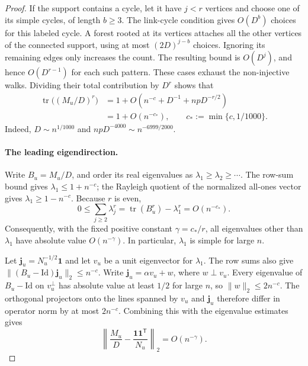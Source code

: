 \begin{proof}
If the support contains a cycle, let it have $j<r$ vertices and choose
one of its simple cycles, of length $b\ge3$.  The link-cycle condition
gives $O(D^b)$ choices for this labeled cycle.  A forest rooted at its
vertices attaches all the other vertices of the connected support,
using at most $(2D)^{j-b}$ choices.  Ignoring its remaining edges only
increases the count.  The resulting bound is $O(D^j)$, and hence
$O(D^{r-1})$ for each such pattern.  These cases exhaust the
non-injective walks.  Dividing their total contribution by $D^r$
shows that
\begin{equation}\label{eq:link-trace}
 \begin{aligned}
 \operatorname{tr}\bigl((M_u/D)^r\bigr)
 &=1+O\!\left(n^{-c}+D^{-1}+npD^{-r/2}\right)\\
 &=1+O(n^{-c_*}),\qquad c_*:=\min\{c,1/1000\}.
 \end{aligned}
\end{equation}
Indeed, $D\sim n^{1/1000}$ and
$npD^{-4000}\sim n^{-6999/2000}$.

\paragraph{The leading eigendirection.}
Write $B_u=M_u/D$, and order its real eigenvalues as
$\lambda_1\ge\lambda_2\ge\cdots$.  The row-sum bound gives
$\lambda_1\le1+n^{-c}$; the Rayleigh quotient of the normalized
all-ones vector gives $\lambda_1\ge1-n^{-c}$.  Because $r$ is even,
\[
 0\le\sum_{j\ge2}\lambda_j^r
 =\operatorname{tr}(B_u^r)-\lambda_1^r
 =O(n^{-c_*}).
\]
Consequently, with the fixed positive constant
$\gamma=c_*/r$, all eigenvalues other than $\lambda_1$ have absolute
value $O(n^{-\gamma})$.  In particular, $\lambda_1$ is simple for
large $n$.

Let $\mathbf j_u=N_u^{-1/2}\mathbf1$ and let $v_u$ be a unit
eigenvector for $\lambda_1$.  The row sums also give
$\lVert(B_u-\mathrm{Id})\mathbf j_u\rVert_2\le n^{-c}$.
Write $\mathbf j_u=\alpha v_u+w$, where $w\perp v_u$.  Every
eigenvalue of $B_u-\mathrm{Id}$ on $v_u^\perp$ has absolute value at
least $1/2$ for large $n$, so $\lVert w\rVert_2\le2n^{-c}$.
The orthogonal projectors onto the lines spanned by $v_u$ and
$\mathbf j_u$ therefore differ in operator norm by at most
$2n^{-c}$.  Combining this with the eigenvalue estimates gives
\begin{equation}\label{eq:star-approximation}
 \left\lVert \frac{M_u}{D}-\frac{\mathbf1\mathbf1^{\mathsf T}}{N_u}
 \right\rVert_2=O(n^{-\gamma}).
\end{equation}


\end{proof}

